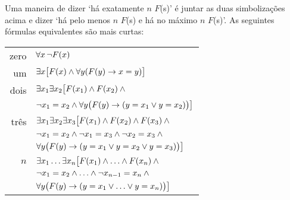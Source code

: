 Uma maneira de dizer `há exatamente $n$ $F$(s)' é juntar as duas simbolizações acima e dizer `há pelo menos $n$ $F$(s) e há no máximo $n$ $F$(s)'. As seguintes fórmulas equivalentes são mais curtas: 
\begin{tabular*}{\textwidth}{rl}
zero & $\forall x\,\neg \mathord{F}(x)$\\
um & $\exists x\bigl[\mathord{F}(x) \wedge \forall y(\mathord{F}(y) \rightarrow x = y)\bigr]$\\
dois & $\exists x_1\exists x_2\bigl[\mathord{F}(x_1) \wedge \mathord{F}(x_2) \wedge {}$\\
& $\neg x_1 = x_2 \wedge \forall y\bigl(\mathord{F}(y) \rightarrow (y= x_1 \vee y = x_2)\bigr) \bigr]$\\
três & $\exists x_1\exists x_2\exists x_3\bigl[\mathord{F}(x_1) \wedge \mathord{F}(x_2) \wedge \mathord{F}(x_3) \wedge {}$\\
& $\neg x_1 =  x_2 \wedge \neg  x_1 = x_3 \wedge \neg x_2 = x_3 \wedge {}$\\
& $\forall y\bigl(\mathord{F}(y) \rightarrow (y = x_1 \vee y = x_2 \vee y =  x_3)\bigr) \bigr]$\\
$n$ & $\exists x_1\ldots\exists x_n\bigl[\mathord{F}(x_1) \wedge\ldots\wedge \mathord{F}(x_n)  \wedge {}$\\
&$ \neg x_1 = x_2 \wedge\ldots\wedge \neg x_{n-1}= x_n \wedge \phantom{.}$\\
& $\forall y\bigl(\mathord{F}(y) \rightarrow (y= x_1 \vee \ldots \vee y= x_n)\bigr)\bigr]$ 
\end{tabular*}


